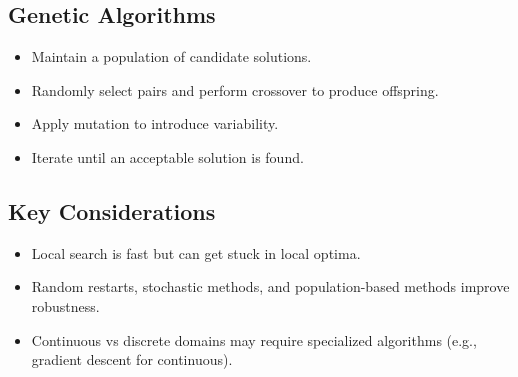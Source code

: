 \subsection{Genetic Algorithms}
\begin{itemize}
    \item Maintain a population of candidate solutions.
    \item Randomly select pairs and perform crossover to produce offspring.
    \item Apply mutation to introduce variability.
    \item Iterate until an acceptable solution is found.
\end{itemize}

\subsection{Key Considerations}
\begin{itemize}
    \item Local search is fast but can get stuck in local optima.
    \item Random restarts, stochastic methods, and population-based methods improve robustness.
    \item Continuous vs discrete domains may require specialized algorithms (e.g., gradient descent for continuous).
\end{itemize}

